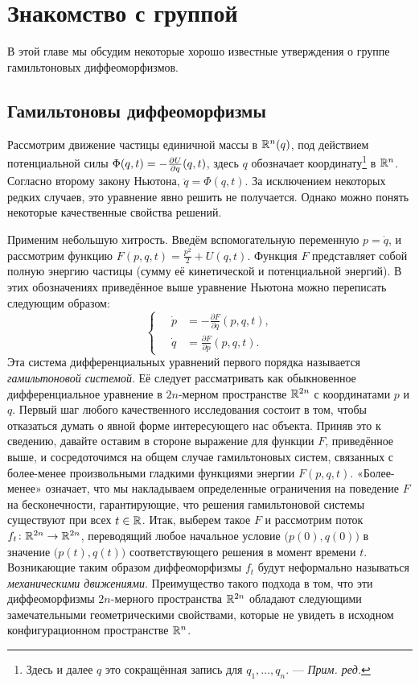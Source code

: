 \chapter{Знакомство с группой}\label{chap:1}

В этой главе мы обсудим некоторые хорошо известные утверждения о группе гамильтоновых диффеоморфизмов. 

\section[Гамильтоновы диффеоморфизмы]{Гамильтоновы диффеоморфизмы}

Рассмотрим движение частицы единичной массы в $\mathbb{R}^n(q)$, под
действием потенциальной силы $\Phi(q, t)  \z= - \tfrac{\partial
  U}{\partial q} (q, t)$, здесь $q$ обозначает
координату\footnote{Здесь и далее  $q$ это сокращённая запись для
  $q_1,\dots,q_n$. — \textit{Прим. ред.}} в $\mathbb{R}^n$. 
Согласно второму закону Ньютона, $\ddot q= \Phi (q, t)$.
За исключением некоторых редких случаев, это уравнение явно решить не получается.
Однако можно понять некоторые качественные свойства решений.

Применим небольшую хитрость.
Введём вспомогательную переменную $p = \dot q$, и рассмотрим функцию
$F(p,q,t)= \tfrac {p^2} 2 + U (q, t)$. 
Функция $F$ представляет собой полную энергию частицы (сумму её
кинетической и потенциальной энергий). 
В этих обозначениях приведённое выше уравнение Ньютона можно переписать следующим образом:
\[
\begin{cases}
\quad\dot p &= - \tfrac{\partial F}{\partial q} (p, q, t),\\
\quad\dot q &= \tfrac{\partial F}{\partial p} (p, q, t).
\end{cases}
\]
Эта система дифференциальных уравнений первого порядка называется
\emph{гамильтоновой системой}. 
Её следует рассматривать как обыкновенное дифференциальное уравнение в
$2n$-мерном пространстве $\mathbb{R}^{2n}$ с координатами $p$ и $q$. 
Первый шаг любого качественного исследования состоит в том, чтобы
отказаться думать о явной форме интересующего нас объекта. 
Приняв это к сведению, давайте оставим в стороне выражение для функции $F$, приведённое выше, и сосредоточимся на общем случае гамильтоновых систем, связанных с
более-менее произвольными гладкими функциями энергии $F (p, q, t)$. 
«Более-менее» означает, что мы накладываем определенные ограничения на
поведение $F$ на бесконечности, гарантирующие, что решения
гамильтоновой системы существуют при всех $t\in \mathbb{R}$. 
Итак, выберем такое $F$ и рассмотрим поток $f_t\colon \mathbb{R}^{2n} \to
\mathbb{R}^{2n}$, переводящий любое начальное условие $\big(p(0),q(0)\big)$ в
значение $\big(p (t), q (t)\big)$ соответствующего решения в момент
времени $t$. 
Возникающие таким образом диффеоморфизмы $f_t$ будут неформально называться \emph{механическими движениями}.
Преимущество такого подхода в том, что эти диффеоморфизмы $2n$-мерного пространства $\mathbb{R}^{2n}$ обладают следующими замечательными геометрическими свойствами, которые не увидеть в исходном конфигурационном пространстве $\mathbb{R}^n$.

